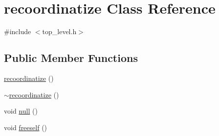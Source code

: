 \hypertarget{classrecoordinatize}{}\section{recoordinatize Class Reference}
\label{classrecoordinatize}


{\ttfamily \#include $<$top\+\_\+level.\+h$>$}

\subsection*{Public Member Functions}
\begin{DoxyCompactItemize}
\item 
\mbox{\hyperlink{classrecoordinatize_a91e9ab3b29a54e13c3845aa840d4308b}{recoordinatize}} ()
\item 
\mbox{\hyperlink{classrecoordinatize_a3dffd2980a9c6a971d4a45f9c7e5fa6f}{$\sim$recoordinatize}} ()
\item 
void \mbox{\hyperlink{classrecoordinatize_a64a3ae223d272051c4ab32ceba842f24}{null}} ()
\item 
void \mbox{\hyperlink{classrecoordinatize_a54a3826523ae73370a2f4bee913e4cd0}{freeself}} ()
\item 

\end{DoxyCompactItemize}
